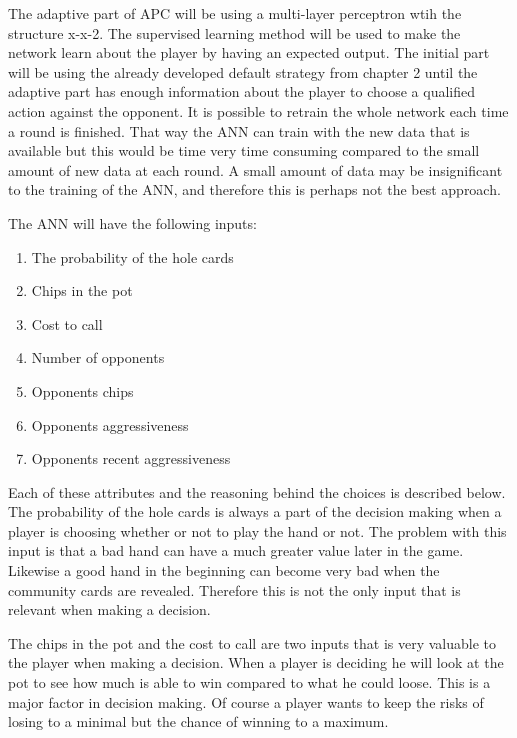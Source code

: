 The adaptive part of APC will be using a multi-layer perceptron wtih the structure x-x-2. The supervised learning method will be used to make the network learn about the player by having an expected output. The initial part will be using the already developed default strategy from chapter 2 until the adaptive part has enough information about the player to choose a qualified action against the opponent.
It is possible to retrain the whole network each time a round is finished. That way the ANN can train with the new data that is available but this would be time very time consuming compared to the small amount of new data at each round.
A small amount of data may be insignificant to the training of the ANN, and therefore this is perhaps not the best approach.

The ANN will have the following inputs:

\begin{enumerate}
  \item The probability of the hole cards
  \item Chips in the pot
  \item Cost to call
  \item Number of opponents
  \item Opponents chips
  \item Opponents aggressiveness
  \item Opponents recent aggressiveness
\end{enumerate}


Each of these attributes and the reasoning behind the choices is described below.\\

The probability of the hole cards is always a part of the decision making when a player is choosing whether or not to play the hand or not. The problem with this input is that a bad hand can have a much greater value later in the game. Likewise a good hand in the beginning can become very bad when the community cards are revealed. Therefore this is not the only input that is relevant when making a decision.


The chips in the pot and the cost to call are two inputs that is very valuable to the player when making a decision. When a player is deciding he will look at the pot to see how much is able to win compared to what he could loose. This is a major factor in decision making. Of course a player wants to keep the risks of losing to a minimal but the chance of winning to a maximum.

